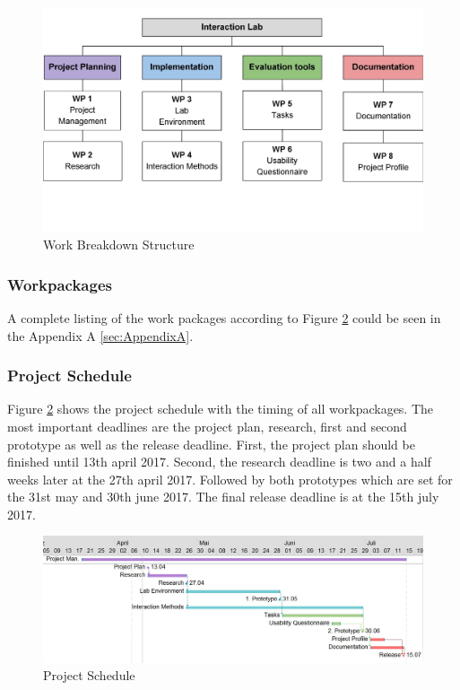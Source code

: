 \begin{figure}[H] 
	\center 
	\includegraphics[width= 15 cm]{Images/WBS.jpg}			
	\caption[]{Work Breakdown Structure}
	\label{fig:wbs}
\end{figure}
\subsubsection{Workpackages}\label{sec:PMWorkpackages}
A complete listing of the work packages according to Figure \ref{fig:wbs} could be seen in the Appendix A \ref{sec:AppendixA}.

\subsubsection{Project Schedule}\label{sec:PMSchedule}

Figure \ref{fig:wbs} shows the project schedule with the timing of all workpackages. The most important deadlines are the project plan, research, first and second prototype as well as the release deadline. First, the project plan should be finished until 13th april 2017. Second, the research deadline is two and a half weeks later at the 27th april 2017. Followed by both prototypes which are set for the 31st may and 30th june 2017. The final release deadline is at the 15th july 2017.

\begin{figure}[H] 
	\center 
	\includegraphics[width= 15 cm]{Images/Gantdiagramm.jpg}			
	\caption[]{Project Schedule}
	\label{fig:wbs}
\end{figure}

